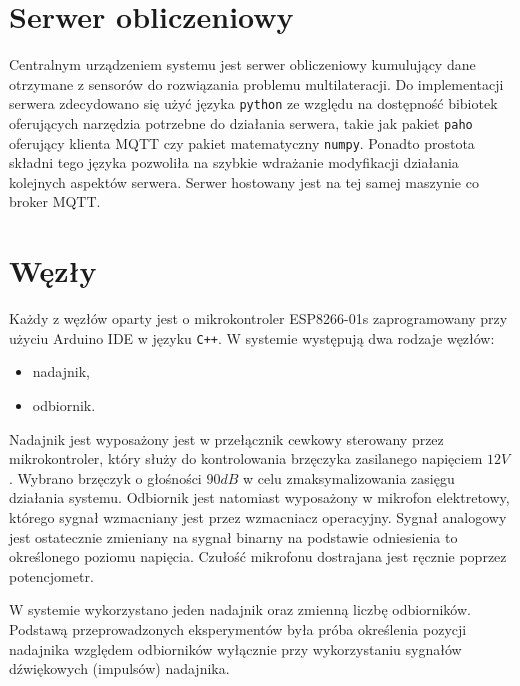 \section{Serwer obliczeniowy}

Centralnym urządzeniem systemu jest serwer obliczeniowy kumulujący dane otrzymane z sensorów do rozwiązania problemu multilateracji. Do implementacji serwera zdecydowano się użyć języka \texttt{python} ze względu na dostępność bibiotek oferujących narzędzia potrzebne do działania serwera, takie jak pakiet \texttt{paho} oferujący klienta MQTT czy pakiet matematyczny \texttt{numpy}. Ponadto prostota składni tego języka pozwoliła na szybkie wdrażanie modyfikacji działania kolejnych aspektów serwera. Serwer hostowany jest na tej samej maszynie co broker MQTT.

\section{Węzły}

Każdy z węzłów oparty jest o mikrokontroler ESP8266-01s zaprogramowany przy użyciu Arduino IDE w języku \texttt{C++}. W systemie występują dwa rodzaje węzłów:
\begin{itemize}
    \item nadajnik,
    \item odbiornik.
\end{itemize}
Nadajnik jest wyposażony jest w przełącznik cewkowy sterowany przez mikrokontroler, który służy do kontrolowania brzęczyka zasilanego napięciem $12V$. Wybrano brzęczyk o głośności $90dB$ w celu zmaksymalizowania zasięgu działania systemu. Odbiornik jest natomiast wyposażony w mikrofon elektretowy, którego sygnał wzmacniany jest przez wzmacniacz operacyjny. Sygnał analogowy jest ostatecznie zmieniany na sygnał binarny na podstawie odniesienia to określonego poziomu napięcia. Czułość mikrofonu dostrajana jest ręcznie poprzez potencjometr. 

W systemie wykorzystano jeden nadajnik oraz zmienną liczbę odbiorników. Podstawą przeprowadzonych eksperymentów była próba określenia pozycji nadajnika względem odbiorników wyłącznie przy wykorzystaniu sygnałów dźwiękowych (impulsów) nadajnika.